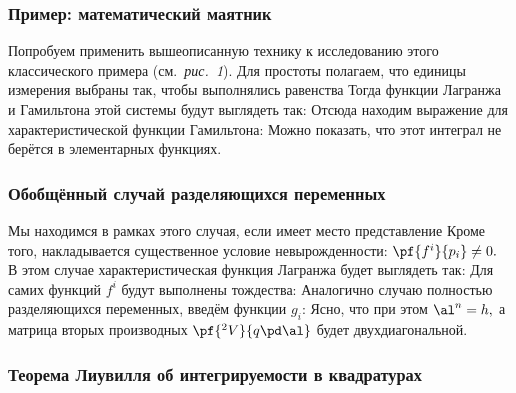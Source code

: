 \documentclass[a4paper,12pt]{article}
\newcommand{\tpic}[1]{\emph{#1}}
\begin{document}
\subsubsection{Пример: математический маятник}

Попробуем применить вышеописанную технику к исследованию этого классического примера (см.~\tpic{рис.~1}).
Для простоты полагаем, что единицы измерения выбраны так, чтобы выполнялись равенства
Тогда функции Лагранжа и Гамильтона этой системы будут выглядеть так:
Отсюда находим выражение для характеристической функции Гамильтона:
Можно показать, что этот интеграл не берётся в элементарных функциях.

\subsubsection{Обобщённый случай разделяющихся переменных}

Мы находимся в рамках этого случая, если имеет место представление
Кроме того, накладывается существенное условие невырожденности: $\pf{f^i}{p_i}\neq0.$
В этом случае характеристическая функция Лагранжа будет выглядеть так:
Для самих функций $f^i$ будут выполнены тождества:
Аналогично случаю полностью разделяющихся переменных, введём функции $g_i$:
Ясно, что при этом $\al^n=h,$ а матрица вторых производных $\pf{^2V}{q\pd\al}$ будет двухдиагональной.

\subsubsection{Теорема Лиувилля об интегрируемости в квадратурах}
\end{document}
